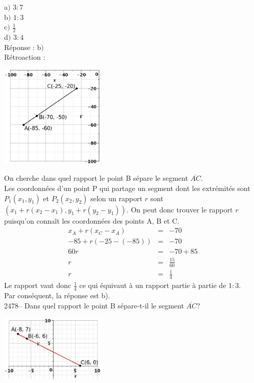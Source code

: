 \documentclass[letterpaper, 12pt]{article}
\begin{document}
a$)$ $3:7$\\
b$)$ $1:3$\\
c$)$ $\frac{1}{2}$\\
d$)$ $3:4$\\

R\'eponse : b$)$\\

R\'etroaction :\\
\begin{center}
 \includegraphics[width=5cm,bb=0 442 400 842]{Q2477.eps}
\end{center}
On cherche dans quel rapport le point B s\'epare le segment $\overline{AC}$.\\
Les coordonn\'ees d'un point P qui partage un segment dont les extr\'emit\'es sont $P_{1}(x_{1}, y_{1})$ et $P_{2}(x_{2}, y_{2})$ selon un rapport $r$ sont $\left( x_{1}+r(x_{2}-x_{1}), y_{1}+r(y_{2}-y_{1})\right) $. On peut donc trouver le rapport $r$ puisqu'on conna\^it les coordonn\'ees des points A, B et C.
\begin{eqnarray*}
 x_{A}+r(x_{C}-x_{A})&=&-70\\
-85+r(-25-(-85))&=&-70\\
60r&=&-70+85\\[2mm]
r&=&\frac{15}{60}\\[2mm]
r&=&\frac{1}{4}
\end{eqnarray*}
Le rapport vaut donc $\frac{1}{4}$ ce qui \'equivaut \`a un rapport partie \`a partie de $1:3$.\\
Par cons\'equent, la r\'eponse est b).\\

2478-- Dans quel rapport le point B s\'epare-t-il le segment $\overline{AC}$? \\
\begin{center}
 \includegraphics[width=5cm,bb=14 14 415 267]{Q2478.eps}
\end{center}
\end{document}
